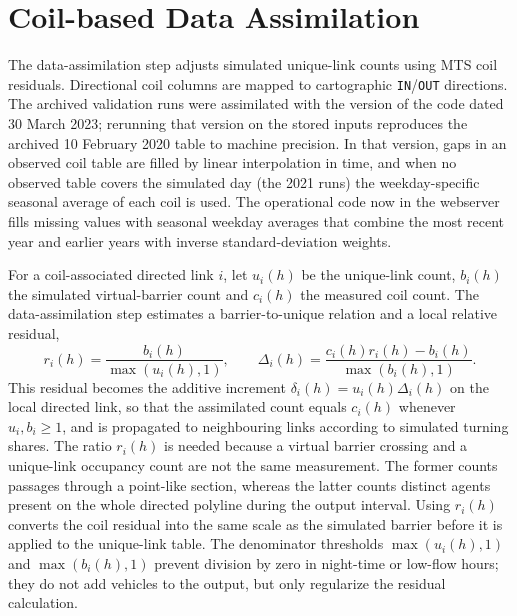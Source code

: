 \documentclass[11pt,a4paper]{article}
\newcommand{\code}[1]{\texttt{#1}}
\begin{document}
\section{Coil-based Data Assimilation}
\label{sec:post-correction}

The data-assimilation step adjusts simulated unique-link counts using MTS coil residuals. Directional coil columns are mapped to cartographic
\code{IN}/\code{OUT} directions. The archived validation runs were assimilated with the version of the code dated 30 March 2023; rerunning that version on the stored inputs reproduces the archived 10 February 2020 table to machine precision. In that version, gaps in an observed coil table are filled by linear interpolation in time, and when no observed table covers the simulated day (the 2021 runs) the weekday-specific seasonal average of each coil is used. The operational code now in the webserver fills missing values with seasonal weekday averages that combine the most recent year and earlier years with inverse standard-deviation weights.

For a coil-associated directed link $i$, let $u_i(h)$ be the unique-link count, $b_i(h)$ the simulated virtual-barrier count and $c_i(h)$ the measured coil count. The data-assimilation step estimates a barrier-to-unique relation and a local relative residual,
\begin{equation}
r_i(h)=\frac{b_i(h)}{\max(u_i(h),1)}, \qquad
\Delta_i(h)=
\frac{c_i(h)r_i(h)-b_i(h)}{\max(b_i(h),1)}.
\end{equation}
This residual becomes the additive increment $\delta_i(h)=u_i(h)\Delta_i(h)$ on the local directed link, so that the assimilated count equals $c_i(h)$ whenever $u_i,b_i\ge1$, and is propagated to neighbouring links according to simulated turning shares. The ratio $r_i(h)$ is needed because a virtual barrier crossing and a unique-link occupancy count are not the same measurement. The former counts passages through a point-like section, whereas the latter counts distinct agents present on the whole directed polyline during the output interval. Using $r_i(h)$ converts the coil residual into the same scale as the simulated barrier before it is applied to the unique-link table. The denominator thresholds $\max(u_i(h),1)$ and $\max(b_i(h),1)$ prevent division by zero in night-time or low-flow hours; they do not add vehicles to the output, but only regularize the residual calculation.
\end{document}
